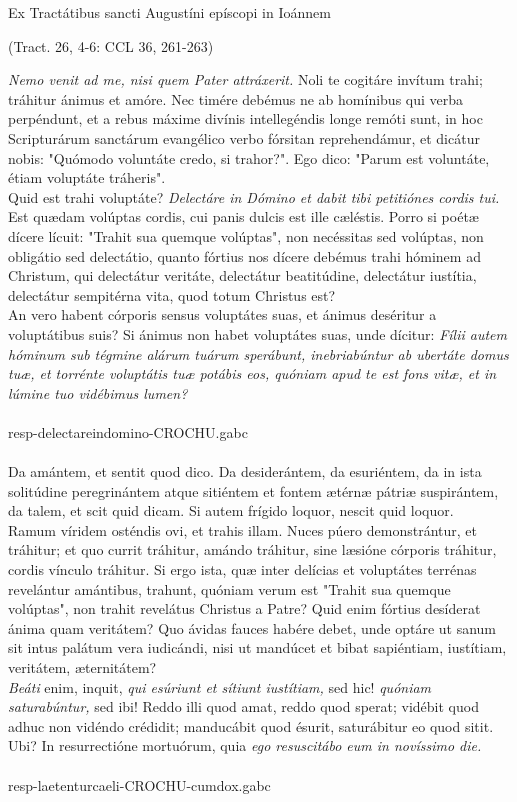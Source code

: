 \documentclass[options]{article}
\begin{document}
	Ex Tractátibus sancti Augustíni epíscopi in Ioánnem
	\begin{flushright}
		 (Tract. 26, 4-6: CCL 36, 261-263)
	\end{flushright}
	\emph{Nemo venit ad me, nisi quem Pater attráxerit.}
	Noli te cogitáre invítum trahi; tráhitur ánimus et amóre. Nec timére debémus ne ab homínibus qui verba perpéndunt, et a rebus máxime divínis intellegéndis longe remóti sunt, in hoc Scripturárum sanctárum evangélico verbo fórsitan reprehendámur, et dicátur nobis: "Quómodo voluntáte credo, si trahor?". Ego dico: "Parum est voluntáte, étiam voluptáte tráheris".\\
	 Quid est trahi voluptáte?
	 \emph{Delectáre in Dómino et dabit tibi petitiónes cordis tui.}
	 Est quædam volúptas cordis, cui panis dulcis est ille cæléstis. Porro si poétæ dícere lícuit: "Trahit sua quemque volúptas", non necéssitas sed volúptas, non obligátio sed delectátio, quanto fórtius nos dícere debémus trahi hóminem ad Christum, qui delectátur veritáte, delectátur beatitúdine, delectátur iustítia, delectátur sempitérna vita, quod totum Christus est?\\
	   An vero habent córporis sensus voluptátes suas, et ánimus deséritur a voluptátibus suis? Si ánimus non habet voluptátes suas, unde dícitur:
	   \emph{Fílii autem hóminum sub tégmine alárum tuárum sperábunt, inebriabúntur ab ubertáte domus tuæ, et torrénte voluptátis tuæ potábis eos, quóniam apud te est fons vitæ, et in lúmine tuo vidébimus lumen?}\\
	   \\
	    resp-delectareindomino-CROCHU.gabc\\
	    \\
	    Da amántem, et sentit quod dico. Da desiderántem, da esuriéntem, da in ista solitúdine peregrinántem atque sitiéntem et fontem ætérnæ pátriæ suspirántem, da talem, et scit quid dicam. Si autem frígido loquor, nescit quid loquor.\\
	     Ramum víridem osténdis ovi, et trahis illam. Nuces púero demonstrántur, et tráhitur; et quo currit tráhitur, amándo tráhitur, sine læsióne córporis tráhitur, cordis vínculo tráhitur. Si ergo ista, quæ inter delícias et voluptátes terrénas revelántur amántibus, trahunt, quóniam verum est "Trahit sua quemque volúptas", non trahit revelátus Christus a Patre? Quid enim fórtius desíderat ánima quam veritátem? Quo ávidas fauces habére debet, unde optáre ut sanum sit intus palátum vera iudicándi, nisi ut mandúcet et bibat sapiéntiam, iustítiam, veritátem, æternitátem?\\
	     \emph{Beáti}
	     enim, inquit,
	     \emph{qui esúriunt et sítiunt iustítiam,}
	     sed hic! 
	      \emph{quóniam saturabúntur,}
	     sed ibi! Reddo illi quod amat, reddo quod sperat; vidébit quod adhuc non vidéndo crédidit; manducábit quod ésurit, saturábitur eo quod sitit. Ubi? In resurrectióne mortuórum, quia 
	      \emph{ego resuscitábo eum in novíssimo die.}\\
	      \\
	      resp-laetenturcaeli-CROCHU-cumdox.gabc\\
	      
	       
	     
	    
	 
	
	
\end{document}
